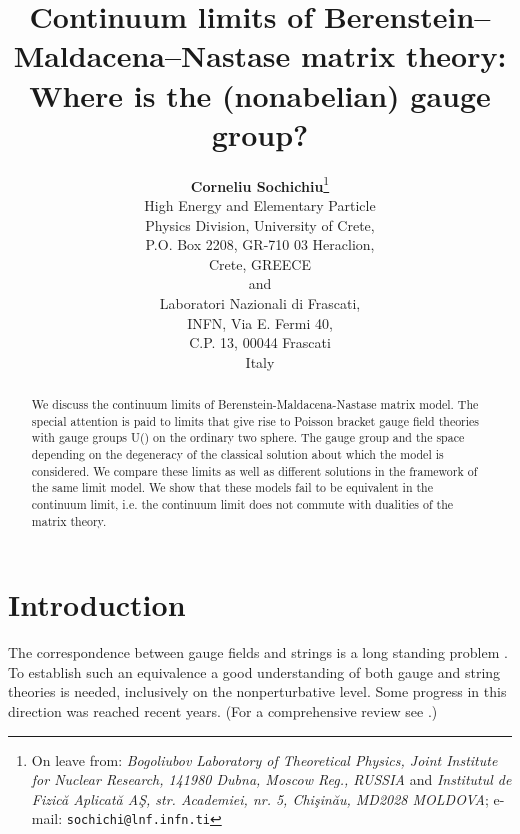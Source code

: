 \documentclass[a4paper]{article}
\begin{document}
\title{Continuum limits of Berenstein--Maldacena--Nastase matrix theory: Where is the
(nonabelian) gauge group?}

\author{\textbf{Corneliu Sochichiu}\thanks{
On leave from: \textit{Bogoliubov Laboratory of Theoretical
Physics, Joint Institute for Nuclear Research, 141980 Dubna,
Moscow Reg., RUSSIA} and \textit{Institutul de Fizic\u a Aplicat\u
a A\c S, str. Academiei, nr. 5, Chi\c sin\u au, MD2028 MOLDOVA};
e-mail: \texttt{sochichi@lnf.infn.ti}}\\
High Energy and Elementary Particle\\
Physics Division,
University of Crete,\\
P.O. Box 2208, GR-710 03 Heraclion,\\ Crete,
GREECE\\
and\\
Laboratori Nazionali di Frascati,\\
INFN, Via E. Fermi 40,\\
C.P. 13, 00044 Frascati\\
Italy
}


\maketitle
\begin{abstract}
We discuss the continuum limits of Berenstein-Maldacena-Nastase
matrix model. The special attention is paid to limits that give
rise to Poisson bracket gauge field theories with gauge groups
U(\coordHE{}) on the ordinary two sphere. The gauge group and the space
depending on the degeneracy of the classical solution about which
the model is considered. We compare these limits as well as
different solutions in the framework of the same limit model. We
show that these models fail to be equivalent in the continuum
limit, i.e. the continuum limit does not commute with dualities of
the matrix theory.
\end{abstract}






\section{Introduction}
The correspondence between gauge fields and strings is a long
standing problem \cite{'tHooft:1974jz}. To establish such an
equivalence a good understanding of both gauge and string theories
is needed, inclusively on the nonperturbative level. Some progress
in this direction was reached recent years. (For a comprehensive
review see \cite{Aharony:1999ti}.)
\end{document}
